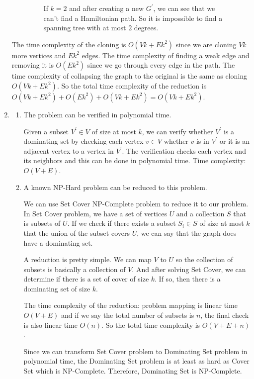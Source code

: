 \documentclass{article}
\begin{document}
\begin{enumerate}
\begin{enumerate}
\begin{figure}[H]
\begin{minipage}{0.3\textwidth}
                \caption{If $k=2$ and after creating a new $G^\prime$, we can see that we can't find a Hamiltonian path. So it is impossible to find a spanning tree with at most $2$ degrees.}
            \end{minipage}
        \end{figure}
    \end{enumerate}

    The time complexity of the cloning is $O(Vk+Ek^2)$ since we are cloning $Vk$ more vertices and $Ek^2$ edges.
    The time complexity of finding a weak edge and removing it is $O(Ek^2)$ since we go through every edge in the path.
    The time complexity of collapsing the graph to the original is the same as cloning $O(Vk+Ek^2)$.
    So the total time complexity of the reduction is $O(Vk+Ek^2)+O(Ek^2)+O(Vk+Ek^2)=O(Vk+Ek^2)$.

    \item 
    
    \begin{enumerate}
        \item The problem can be verified in polynomial time.

        Given a subset $V^\prime \in V$ of size at most $k$, we can verify whether $V^\prime$ is a dominating set by checking each vertex $v\in V$ whether $v$ is in $V^\prime$ or it is an adjacent vertex to a vertex in $V^\prime$.
        The verification checks each vertex and its neighbors and this can be done in polynomial time.
        Time complexity: $O(V+E)$.

        \item A known NP-Hard problem can be reduced to this problem.

        We can use Set Cover NP-Complete problem to reduce it to our problem.
        In Set Cover problem, we have a set of vertices $U$ and a collection $S$ that is subsets of $U$.
        If we check if there exists a subset $S_i \in S$ of size at most $k$ that the union of the subset covers $U$, we can say that the graph does have a dominating set.

        A reduction is pretty simple. We can map $V$ to $U$ so the collection of subsets is basically a collection of $V$.
        And after solving Set Cover, we can determine if there is a set of cover of size $k$.
        If so, then there is a dominating set of size $k$.

        The time complexity of the reduction: problem mapping is linear time $O(V+E)$ and if we say the total number of subsets is $n$, the final check is also linear time $O(n)$.
        So the total time complexity is $O(V+E+n)$.

        Since we can transform Set Cover problem to Dominating Set problem in polynomial time, the Dominating Set problem is at least as hard as Cover Set which is NP-Complete.
        Therefore, Dominating Set is NP-Complete.
    
    \end{enumerate}
\end{enumerate}
\end{document}
